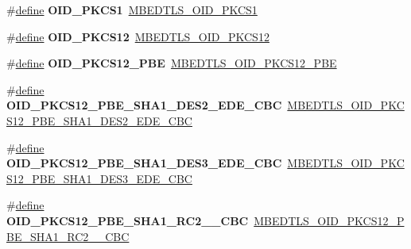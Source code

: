 \begin{DoxyCompactItemize}
\#\hyperlink{structdefine}{define} {\bfseries O\+I\+D\+\_\+\+P\+K\+C\+S1}~\hyperlink{oid_8h_afb1e14265b5d4e6e4bda16b4a2b9853c}{M\+B\+E\+D\+T\+L\+S\+\_\+\+O\+I\+D\+\_\+\+P\+K\+C\+S1}
\item 
\mbox{\label{compat-1_83_8h_a040b6933c066ff76e97f957c922e0141}} 
\#\hyperlink{structdefine}{define} {\bfseries O\+I\+D\+\_\+\+P\+K\+C\+S12}~\hyperlink{oid_8h_a54f5eedb526dfbb4fcb3f2de505f9c72}{M\+B\+E\+D\+T\+L\+S\+\_\+\+O\+I\+D\+\_\+\+P\+K\+C\+S12}
\item 
\mbox{\label{compat-1_83_8h_a2557ce6cb40f5c109cb5887ae79fbd84}} 
\#\hyperlink{structdefine}{define} {\bfseries O\+I\+D\+\_\+\+P\+K\+C\+S12\+\_\+\+P\+BE}~\hyperlink{oid_8h_accf72d47a7630266420e6ad7028908c8}{M\+B\+E\+D\+T\+L\+S\+\_\+\+O\+I\+D\+\_\+\+P\+K\+C\+S12\+\_\+\+P\+BE}
\item 
\mbox{\label{compat-1_83_8h_a79f9a0b7005a98bf6daefbbf486dcbc6}} 
\#\hyperlink{structdefine}{define} {\bfseries O\+I\+D\+\_\+\+P\+K\+C\+S12\+\_\+\+P\+B\+E\+\_\+\+S\+H\+A1\+\_\+\+D\+E\+S2\+\_\+\+E\+D\+E\+\_\+\+C\+BC}~\hyperlink{oid_8h_a082e4a3dfa00272ecf769887ad972697}{M\+B\+E\+D\+T\+L\+S\+\_\+\+O\+I\+D\+\_\+\+P\+K\+C\+S12\+\_\+\+P\+B\+E\+\_\+\+S\+H\+A1\+\_\+\+D\+E\+S2\+\_\+\+E\+D\+E\+\_\+\+C\+BC}
\item 
\mbox{\label{compat-1_83_8h_a9f505cb7301c3ec55e71f33696d5191c}} 
\#\hyperlink{structdefine}{define} {\bfseries O\+I\+D\+\_\+\+P\+K\+C\+S12\+\_\+\+P\+B\+E\+\_\+\+S\+H\+A1\+\_\+\+D\+E\+S3\+\_\+\+E\+D\+E\+\_\+\+C\+BC}~\hyperlink{oid_8h_afb21e2c15664c64c8ff0f3d6c88122dc}{M\+B\+E\+D\+T\+L\+S\+\_\+\+O\+I\+D\+\_\+\+P\+K\+C\+S12\+\_\+\+P\+B\+E\+\_\+\+S\+H\+A1\+\_\+\+D\+E\+S3\+\_\+\+E\+D\+E\+\_\+\+C\+BC}
\item 
\mbox{\label{compat-1_83_8h_add1779affb28b8a7bed9dd474d82495d}} 
\#\hyperlink{structdefine}{define} {\bfseries O\+I\+D\+\_\+\+P\+K\+C\+S12\+\_\+\+P\+B\+E\+\_\+\+S\+H\+A1\+\_\+\+R\+C2\+\_\+\_\+\+C\+BC}~\hyperlink{oid_8h_a93903ee8d6e915c4c03e991b0869ddd9}{M\+B\+E\+D\+T\+L\+S\+\_\+\+O\+I\+D\+\_\+\+P\+K\+C\+S12\+\_\+\+P\+B\+E\+\_\+\+S\+H\+A1\+\_\+\+R\+C2\+\_\+\_\+\+C\+BC}
\item 
\mbox{\label{compat-1_83_8h_a1a772dde5d30e1e97a3c8d09e299060e}} 

\end{DoxyCompactItemize}
